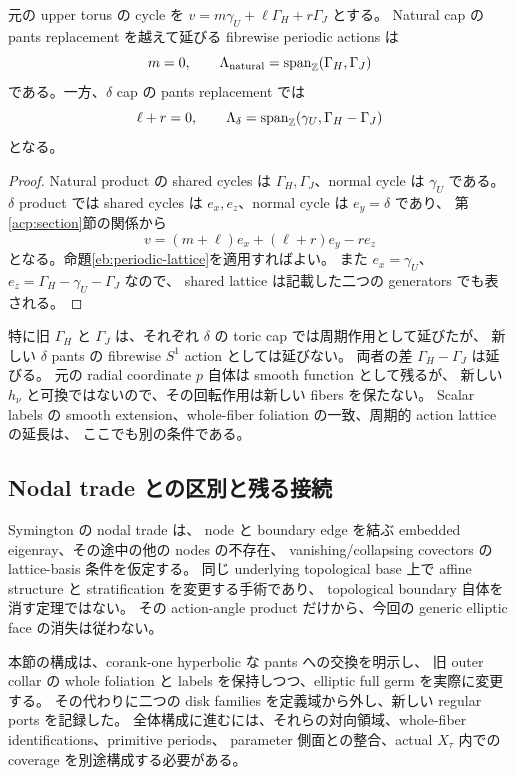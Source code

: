 \begin{corollary}\label{eb:marked-lattices}
元の upper torus の cycle を $v=m\gamma_U+\ell\Gamma_H+r\Gamma_J$ とする。
Natural cap の pants replacement を越えて延びる fibrewise periodic actions は
\[
 m=0,\qquad
 \Lambda_{\rm natural}=\operatorname{span}_{\mathbb Z}(\Gamma_H,\Gamma_J)
\]
である。一方、$\delta$ cap の pants replacement では
\[
 \ell+r=0,\qquad
 \Lambda_\delta=\operatorname{span}_{\mathbb Z}(\gamma_U,\Gamma_H-\Gamma_J)
\]
となる。
\end{corollary}

\begin{proof}
Natural product の shared cycles は $\Gamma_H,\Gamma_J$、normal cycle は $\gamma_U$ である。
$\delta$ product では shared cycles は $e_x,e_z$、normal cycle は $e_y=\delta$ であり、
第\ref{acp:section}節の関係から
\[
 v=(m+\ell)e_x+(\ell+r)e_y-r e_z
\]
となる。命題\ref{eb:periodic-lattice}を適用すればよい。
また $e_x=\gamma_U$、$e_z=\Gamma_H-\gamma_U-\Gamma_J$ なので、
shared lattice は記載した二つの generators でも表される。
\end{proof}

特に旧 $\Gamma_H$ と $\Gamma_J$ は、それぞれ $\delta$ の toric cap では周期作用として延びたが、
新しい $\delta$ pants の fibrewise $S^1$ action としては延びない。
両者の差 $\Gamma_H-\Gamma_J$ は延びる。
元の radial coordinate $p$ 自体は smooth function として残るが、
新しい $h_\nu$ と可換ではないので、その回転作用は新しい fibers を保たない。
Scalar labels の smooth extension、whole-fiber foliation の一致、周期的 action lattice の延長は、
ここでも別の条件である。

\subsection{Nodal trade との区別と残る接続}

Symington の nodal trade \cite[Lemma 6.3, Theorem 6.5]{symington} は、
node と boundary edge を結ぶ embedded eigenray、その途中の他の nodes の不存在、
vanishing/collapsing covectors の lattice-basis 条件を仮定する。
同じ underlying topological base 上で affine structure と stratification を変更する手術であり、
topological boundary 自体を消す定理ではない。
その action-angle product だけから、今回の generic elliptic face の消失は従わない。

本節の構成は、corank-one hyperbolic な pants への交換を明示し、
旧 outer collar の whole foliation と labels を保持しつつ、elliptic full germ を実際に変更する。
その代わりに二つの disk families を定義域から外し、新しい regular ports を記録した。
全体構成に進むには、それらの対向領域、whole-fiber identifications、primitive periods、
parameter 側面との整合、actual $X_\tau$ 内での coverage を別途構成する必要がある。
